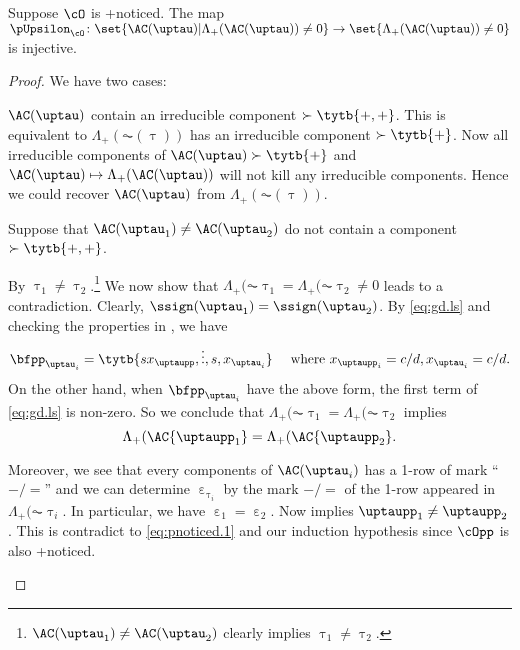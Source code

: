 \documentclass[ssunip]{subfiles}
\begin{document}
\begin{lem}\label{c:gd.pnoticed}\label{c:gd.pnoticed.p}
    Suppose $\cO$ is +noticed.
    The map
    $\pUpsilon_{\cO} \colon \set{\oAC{\uptau}|\Lambda_+(\AC(\uptau))\neq 0}\rightarrow \set{\Lambda_+(\AC(\uptau))\neq 0}$
    is injective.
\end{lem}
\begin{proof}
    We have two cases:
    \begin{enumPF}
      \item $\oAC{\uptau}$ contain an irreducible component $\succ \tytb{+,+}$.
      This is equivalent to $\Lambda_+(\AC(\uptau))$ has an irreducible component
      $\succ\tytb{+}$. Now all irreducible components of
      $\oAC{\uptau} \succ \tytb{+}$ and $\oAC{\uptau}\mapsto \Lambda_+(\AC(\uptau))$ will
      not kill any irreducible components. Hence we could recover $\oAC{\uptau}$
      from $\Lambda_+(\AC(\uptau))$.%
      \item Suppose that $\oAC{\uptau_{1}}\neq \oAC{\uptau_{2}}$ do not contain
      a component $\succ \tytb{+,+}$.

      By 
      $\uptau_{1}\neq \uptau_{2}$.\footnote{$\oAC{\uptau_{1}}\neq \oAC{\uptau_{2}}$
        clearly implies $\uptau_{1}\neq \uptau_{2}$.} We now show that
      $\Lambda_+(\AC{\uptau_{1}}=\Lambda_+(\AC{\uptau_{2}}\neq 0$ leads to a contradiction.
      Clearly, $\ssign(\uptau_{1})=\ssign(\uptau_{2})$.
      By \eqref{eq:gd.ls} and checking the properties in , we have
      \[
        \bfpp_{\uptau_{i}} = \tytb{s{x_{\uptaupp}},\vdots,s,{x_{\uptau_{i}}}} \quad \text{
          where }x_{\uptaupp_{i}}=c/d, x_{\uptau_{i}}=c/d.
      \]
      On the other hand, when $\bfpp_{\uptau_{i}}$ have the above form, the
      first term of \eqref{eq:gd.ls} is non-zero. So we conclude that
      $\Lambda_+(\AC{\uptau_{1}}=\Lambda_+(\AC{\uptau_{2}}$ implies
      \begin{equation}\label{eq:pnoticed.1}
        \Lambda_+(\AC{\uptaupp_{1}}=\Lambda_+(\AC{\uptaupp_{2}}.
      \end{equation}

      Moreover, we see that every components of $\oAC{\uptau_{i}}$ has a 1-row
      of mark ``$-/=$'' and we can determine $\upepsilon_{\uptau_{i}}$ by the
      mark $-/=$ of the 1-row appeared in $\Lambda_+(\AC{\uptau_{i}}$. In particular, we
      have $\upepsilon_{1}=\upepsilon_{2}$. Now  implies
      $\uptaupp_{1}\neq \uptaupp_{2}$. This is contradict to
      \eqref{eq:pnoticed.1} and our induction hypothesis since $\cOpp$ is also
      +noticed.


\end{enumPF}
\end{proof}
\end{document}
